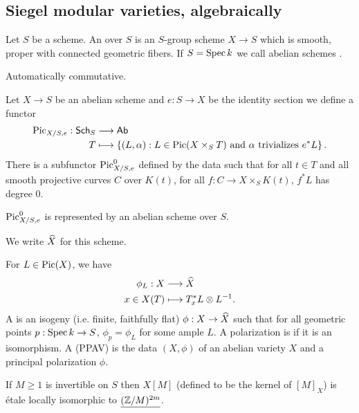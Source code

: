 \subsection{Siegel modular varieties, algebraically}
\begin{definition}
	Let $S$ be a scheme. An  over $S$ is an $S$-group scheme $X\to S$ which is smooth, proper with connected geometric fibers. If $S=\operatorname{Spec} k$ we call abelian schemes .
\end{definition}
\begin{proposition}
	Automatically commutative.
\end{proposition}
\begin{definition}
	Let $X\to S$ be an abelian scheme and $e:S\to X$ be the identity section we define a functor
	\begin{align*}
		\operatorname{Pic}_{X /S,e}: \mathsf{Sch}_{S} &\longrightarrow \mathsf{Ab} \\
		T &\longmapsto \left\{ (L,\alpha): L\in \operatorname{Pic}(X\times_S T)\text{ and }\alpha \text{ trivializes }e^{*}L \right\} .
	\end{align*}
	There is a subfunctor $\operatorname{Pic}_{X /S,e}^{0}$ defined by the data such that for all $t\in T$ and all smooth projective curves $C$ over $K(t)$, for all $f:C\to X\times_S K(t)$, $f^{*}L$ has degree 0.
\end{definition}
\begin{theorem}
	$\operatorname{Pic}^{0}_{X /S,e}$ is represented by an abelian scheme over $S$.
\end{theorem}
We write $\widehat{X}$ for this scheme.
\begin{definition}
	For $L\in \operatorname{Pic}(X)$, we have 
	\begin{align*}
		\phi_L: X &\longrightarrow \widehat{X} \\
		x\in X(T) &\longmapsto T_x^{*}L\otimes L^{-1}.
	\end{align*}
	A  is an isogeny (i.e. finite, faithfully flat) $\phi:X\to \wh{X}$ such that for all geometric points $p:\Spec k\to S$, $\phi_p=\phi_L$ for some ample $L$. A polarization is  if it is an isomorphism. A  (PPAV) is the data $(X,\phi)$ of an abelian variety $X$ and a principal polarization $\phi$.
\end{definition}
\begin{proposition}
	If $M\ge 1$ is invertible on $S$ then $X[M]$ (defined to be the kernel of $[M]_X$) is \'etale locally isomorphic to $\underline{(\mathbb Z /M)^{2m}}$.
\end{proposition}
